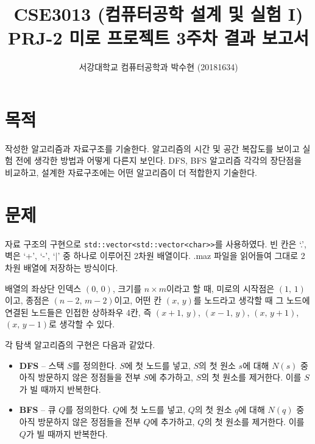 
\newcommand{\norm}[1]{\left\lVert#1\right\rVert}



\title{CSE3013 (컴퓨터공학 설계 및 실험 I) \space \newline PRJ-2 미로 프로젝트 3주차 결과 보고서}
\author{서강대학교 컴퓨터공학과 박수현 (20181634)}
\maketitle

\section{목적}
작성한 알고리즘과 자료구조를 기술한다. 알고리즘의 시간 및 공간 복잡도를 보이고 실험 전에 생각한 방법과 어떻게 다른지 보인다.
DFS, BFS 알고리즘 각각의 장단점을 비교하고, 설계한 자료구조에는 어떤 알고리즘이 더 적합한지 기술한다.

\section{문제}
자료 구조의 구현으로 \texttt{std::vector<std::vector<char>>}를 사용하였다. 빈 칸은 `.', 벽은 `+', `-', `$|$' 중 하나로
이루어진 2차원 배열이다. .maz 파일을 읽어들여 그대로 2차원 배열에 저장하는 방식이다.

배열의 좌상단 인덱스 $\left(0,\,0\right)$, 크기를 $n\times m$이라고 할 때, 미로의 시작점은 $\left(1,\,1\right)$이고, 
종점은 $\left(n-2,\,m-2\right)$이고, 어떤 칸 $\left(x,\,y\right)$를 노드라고 생각할 때 그 노드에 연결된 노드들은 인접한 상하좌우 4칸, 즉
$\left(x + 1,\,y\right)$, $\left(x - 1,\,y\right)$, $\left(x,\,y + 1\right)$, $\left(x,\,y - 1\right)$로 생각할 수 있다.

각 탐색 알고리즘의 구현은 다음과 같았다.

\begin{itemize}
    \item \textbf{DFS} -- 스택 $S$를 정의한다. $S$에 첫 노드를 넣고,
    $S$의 첫 원소 $s$에 대해 $N\left(s\right)$ 중 아직 방문하지 않은 정점들을 전부 $S$에 추가하고,
    $S$의 첫 원소를 제거한다. 이를 $S$가 빌 때까지 반복한다. 
    \item \textbf{BFS} -- 큐 $Q$를 정의한다. $Q$에 첫 노드를 넣고,
    $Q$의 첫 원소 $q$에 대해 $N\left(q\right)$ 중 아직 방문하지 않은 정점들을 전부 $Q$에 추가하고,
    $Q$의 첫 원소를 제거한다. 이를 $Q$가 빌 때까지 반복한다. 
\end{itemize}

